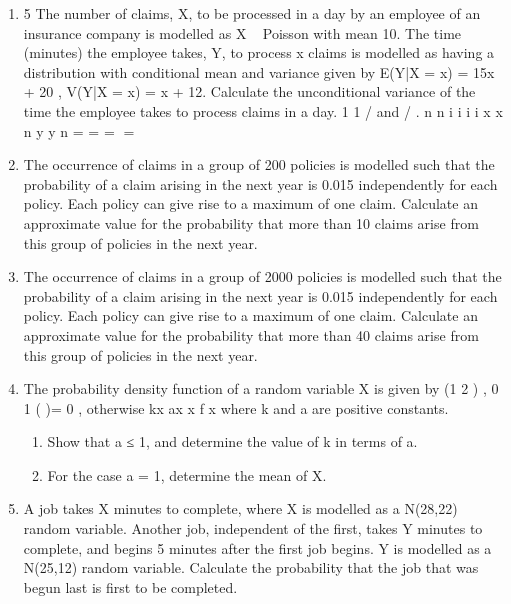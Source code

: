\documentclass[a4paper,12pt]{article}
\begin{document}
\begin{enumerate}
\item 5 The number of claims, X, to be processed in a day by an employee of an insurance company is modelled as X ~ Poisson with mean 10. The time (minutes) the
employee takes, Y, to process x claims is modelled as having a distribution with conditional mean and variance given by
E(Y|X = x) = 15x + 20 , V(Y|X = x) = x + 12.
Calculate the unconditional variance of the time the employee takes to process
claims in a day. 
1 1
/ and / .
n n
i i
i i
x x n y y n
= =
= =

 \item The occurrence of claims in a group of 200 policies is modelled such that
the probability of a claim arising in the next year is 0.015 independently for each policy. Each policy can give rise to a maximum of one claim.
Calculate an approximate value for the probability that more than 10 claims arise from this group of policies in the next year. 
\item The occurrence of claims in a group of 2000 policies is modelled such that
the probability of a claim arising in the next year is 0.015 independently for each policy. Each policy can give rise to a maximum of one claim. Calculate an approximate value for the probability that more than 40
claims arise from this group of policies in the next year. 

\item The probability density function of a random variable X is given by
(1 2 ) , 0 1
( )=
0 , otherwise
kx ax x
f x
where k and a are positive constants.
\begin{enumerate}
\item Show that a ≤ 1, and determine the value of k in terms of a. 
\item For the case a = 1, determine the mean of X. 
\end{enumerate}

\item A job takes X minutes to complete, where X is modelled as a N(28,22) random
variable. Another job, independent of the first, takes Y minutes to complete, and begins 5 minutes after the first job begins. Y is modelled as a N(25,12) random
variable.
Calculate the probability that the job that was begun last is first to be completed.
\end{enumerate}
\end{document}
